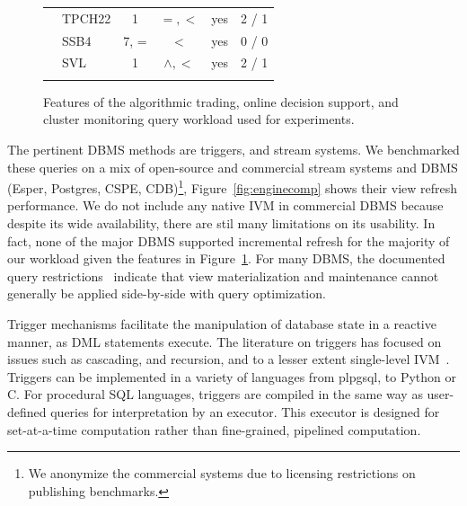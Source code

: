 \begin{figure}[t]
{\begin{center}
\begin{tabular}{ p{0.15cm} | l | c | c | c  | c }
& TPCH22     & 1         & $=,<$         & yes & 2 / 1 \\
& SSB4       & 7, =      & $<$           & yes & 0 / 0 \\
\hline
\comment{
& SVL        & 1         & $\wedge, <$   & yes & 2 / 1 \\
}
\end{tabular}
\end{center}
}
\vspace{-4mm}
\caption{Features of the algorithmic trading, online decision support, and
cluster monitoring query workload used for experiments.}
\label{fig:queries}
\vspace{-4mm}
\end{figure}

The pertinent DBMS methods are triggers, and stream systems.
We benchmarked these queries on a mix of open-source and commercial stream
systems and DBMS (Esper, Postgres, CSPE, CDB)\footnote{We anonymize the
commercial systems due to licensing restrictions on publishing benchmarks.},
Figure~\ref{fig:enginecomp} shows their view refresh performance.
We do not include any native IVM in commercial DBMS because despite its wide
availability, there are stil many limitations on its usability.
In fact, none of the major DBMS supported incremental refresh for the
majority of our workload given the features in Figure~\ref{fig:queries}.
For many DBMS, the documented query
restrictions~\cite{db2-viewrestrict,mssql-viewrestrict,oracle-viewrestrict}
indicate that view materialization and maintenance cannot generally be applied
side-by-side with query optimization.

\vspace{1mm}
Trigger mechanisms facilitate the manipulation of database state in a reactive
manner, as DML statements execute.
The literature on triggers has focused on issues such as cascading, and
recursion, and to a lesser extent single-level IVM~\cite{baralis-rids95}.
Triggers can be implemented in a variety of languages from plpgsql, to Python or
C. For procedural SQL languages, triggers are compiled in the same way as
user-defined queries for interpretation by an executor.
This executor is designed for set-at-a-time computation rather than
fine-grained, pipelined computation. 

